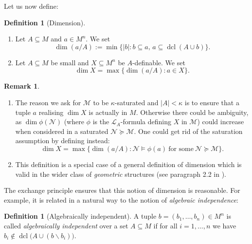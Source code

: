 \documentclass[a4paper]{report}
\newcommand{\ind}{\hspace{15pt}}
\renewcommand{\L}{\mathcal{L}}
\newcommand{\M}{\mathcal{M}}
\newcommand{\N}{\mathcal{N}}
\DeclareMathOperator{\dcl}{dcl}
\theoremstyle{definition}
\newtheorem{defn}[thm]{Definition}
\theoremstyle{remstyle}
\newtheorem{rem}[thm]{Remark}
\begin{document}
\ind Let us now define:

\begin{defn}[Dimension]\
	\begin{enumerate}
		\item Let $A\subseteq M$ and $a\in M^n$. We set
		      \begin{equation*}
			      \dim(a/A):=\min\big\{|b|:b\subseteq a,\,a\subseteq \dcl(A\cup b)\big\}.
		      \end{equation*}
		\item Let $A\subseteq M$ be small and $X\subseteq M^n$ be $A$-definable. We set
		      \begin{equation*}
			      \dim X=\max\{\dim(a/A):a\in X\}.
		      \end{equation*}
	\end{enumerate}
\end{defn}

\begin{rem}\
	\begin{enumerate}
		\item The reason we ask for $\M$ to be $\kappa$-saturated and $|A|<\kappa$ is to ensure that a tuple $a$ realising $\dim X$ is actually in $M$. Otherwise there could be ambiguity, as $\dim \phi(\N)$ (where $\phi$ is the $\L_A$-formula defining $X$ in $\M$) could increase when considered in a saturated $\N\succeq\M$. One could get rid of the saturation assumption by defining instead:
		      \begin{equation*}
			      \dim X=\max\{\dim(a/A): \N\models\phi(a)\ \text{for some}\ \N\succeq\M\}.
		      \end{equation*}
		\item This definition is a special case of a general definition of dimension which is valid in the wider class of \emph{geometric} structures (see paragraph 2.2 in \cite{ominandvariations}).
	\end{enumerate}
\end{rem}

\ind The exchange principle ensures that this notion of dimension is reasonable. For example, it is related in a natural way to the notion of \emph{algebraic independence}:

\begin{defn}[Algebraically independent]
	A tuple $b=(b_1,\ldots,b_n)\in M^n$ is called \emph{algebraically independent} over a set $A\subseteq M$ if for all $i=1,\ldots,n$ we have $b_i\not\in\dcl\big(A\cup(b\backslash b_i)\big)$.
\end{defn}
\end{document}
